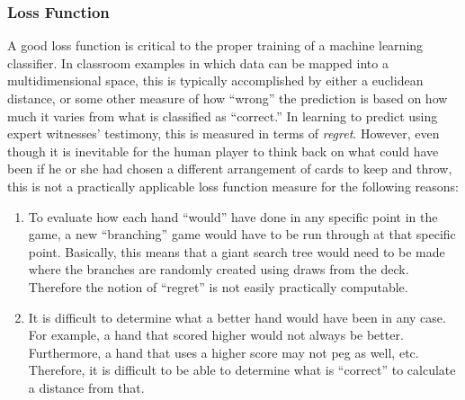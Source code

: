 
\subsubsection{Loss Function}
\label{sec:dm-methods-loss}


A good loss function is critical to the proper training of a machine learning
classifier.
%
In classroom examples in which data can be mapped into a multidimensional
space,
this is typically accomplished by either a euclidean distance, or some other
measure of how ``wrong'' the prediction is based on how much it varies from what
is classified as ``correct.''
%
In learning to predict using expert witnesses' testimony,
this is measured in terms of \textit{regret}.
%
However, even though it is inevitable for the human player to think back on what
could have been if he or she had chosen a different arrangement of cards to keep
and throw, this is not a practically applicable loss function measure for the
following reasons:
%
\begin{enumerate}
\item To evaluate how each hand ``would'' have done in any specific point in the
	game, a new ``branching'' game would have to be run through at that specific
	point. Basically, this means that a giant search tree would need to be made
	where the branches are randomly created using draws from the deck.
	Therefore the notion of ``regret'' is not easily practically computable.

\item It is difficult to determine what a better hand would have been in any
	case.
	For example, a hand that scored higher would not always be better.
	Furthermore, a hand that uses a higher score may not peg as well, etc.
	Therefore, it is difficult to be able to determine what is ``correct'' to
	calculate a distance from that.
\end{enumerate}
%

